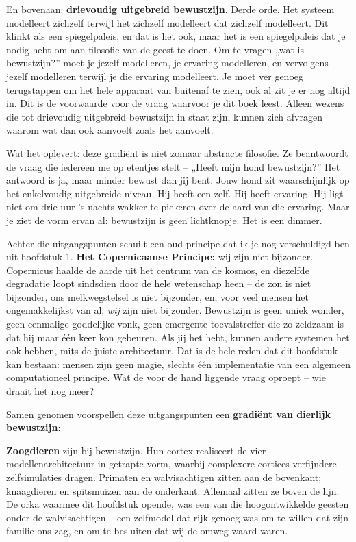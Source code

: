 \documentclass[11pt, twoside, openright]{book}
\begin{document}
En bovenaan: \textbf{drievoudig uitgebreid bewustzijn}. Derde orde. Het systeem modelleert zichzelf terwijl het zichzelf modelleert dat zichzelf modelleert. Dit klinkt als een spiegelpaleis, en dat is het ook, maar het is een spiegelpaleis dat je nodig hebt om aan filosofie van de geest te doen. Om te vragen „wat is bewustzijn?” moet je jezelf modelleren, je ervaring modelleren, en vervolgens jezelf modelleren terwijl je die ervaring modelleert. Je moet ver genoeg terugstappen om het hele apparaat van buitenaf te zien, ook al zit je er nog altijd in. Dit is de voorwaarde voor de vraag waarvoor je dit boek leest. Alleen wezens die tot drievoudig uitgebreid bewustzijn in staat zijn, kunnen zich afvragen waarom wat dan ook aanvoelt zoals het aanvoelt.

Wat het oplevert: deze gradiënt is niet zomaar abstracte filosofie. Ze beantwoordt de vraag die iedereen me op etentjes stelt -- „Heeft mijn hond bewustzijn?” Het antwoord is ja, maar minder bewust dan jij bent. Jouw hond zit waarschijnlijk op het enkelvoudig uitgebreide niveau. Hij heeft een zelf. Hij heeft ervaring. Hij ligt niet om drie uur 's nachts wakker te piekeren over de aard van die ervaring. Maar je ziet de vorm ervan al: bewustzijn is geen lichtknopje. Het is een dimmer.

Achter die uitgangspunten schuilt een oud principe dat ik je nog verschuldigd ben uit hoofdstuk 1. \textbf{Het Copernicaanse Principe:} wij zijn niet bijzonder. Copernicus haalde de aarde uit het centrum van de kosmos, en diezelfde degradatie loopt sindsdien door de hele wetenschap heen -- de zon is niet bijzonder, ons melkwegstelsel is niet bijzonder, en, voor veel mensen het ongemakkelijkst van al, \textit{wij} zijn niet bijzonder. Bewustzijn is geen uniek wonder, geen eenmalige goddelijke vonk, geen emergente toevalstreffer die zo zeldzaam is dat hij maar één keer kon gebeuren. Als jij het hebt, kunnen andere systemen het ook hebben, mits de juiste architectuur. Dat is de hele reden dat dit hoofdstuk kan bestaan: mensen zijn geen magie, slechts één implementatie van een algemeen computationeel principe. Wat de voor de hand liggende vraag oproept -- wie draait het nog meer?

Samen genomen voorspellen deze uitgangspunten een \textbf{gradiënt van dierlijk bewustzijn}:

\textbf{Zoogdieren} zijn bij bewustzijn. Hun cortex realiseert de vier-modellenarchitectuur in getrapte vorm, waarbij complexere cortices verfijndere zelfsimulaties dragen. Primaten en walvisachtigen zitten aan de bovenkant; knaagdieren en spitsmuizen aan de onderkant. Allemaal zitten ze boven de lijn. De orka waarmee dit hoofdstuk opende, was een van die hoogontwikkelde geesten onder de walvisachtigen -- een zelfmodel dat rijk genoeg was om te willen dat zijn familie ons zag, en om te besluiten dat wij de omweg waard waren.
\end{document}

